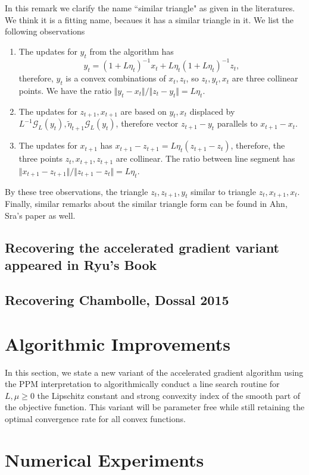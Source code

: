 \documentclass[12pt]{article}
\begin{document}
        \begin{remark}
            In this remark we clarify the name ``similar triangle" as given in the literatures. 
            We think it is a fitting name, becaues it has a similar triangle in it. 
            We list the following observations
            \begin{enumerate}
                \item 
                The updates for $y_{t}$ from the algorithm has 
                $$
                    y_t = (1 + L\eta_t)^{-1} x_t + L\eta_t(1 + L\eta_t)^{-1} z_t, 
                $$
                therefore, $y_t$ is a convex combinations of $x_t, z_t$, so $z_t, y_t, x_t$ are three collinear points. 
                We have the ratio $\Vert y_t - x_t\Vert/\Vert z_t - y_t\Vert = L\eta_t$. 
                \item 
                The updates for $z_{t + 1}, x_{t + 1}$ are based on $y_t, x_t$ displaced by $L^{-1} \mathcal G_L(y_t), \tilde\eta_{t +1} \mathcal G_L(y_t)$, therefore vector $z_{t + 1} - y_t$ parallels to $x_{t + 1} - x_t$. 
                \item The updates for $x_{t + 1}$ has $x_{t + 1} - z_{t + 1} = L\eta_t \left(z_{t + 1} - z_t\right)$, therefore, the three points $z_t, x_{t + 1}, z_{t + 1}$ are collinear. 
                The ratio between line segment has $\Vert x_{t + 1} - z_{t + 1}\Vert/\Vert z_{t + 1} - z_t\Vert = L\eta_t$. 
            \end{enumerate}
            By these tree observations, the triangle $z_{t}, z_{t + 1}, y_t$ similar to triangle $z_t, x_{t + 1}, x_t$. 
            Finally, similar remarks about the similar triangle form can be found in Ahn, Sra's paper \cite{ahn_understanding_2022} as well. 
            
        \end{remark} 
        
    \subsection{Recovering the accelerated gradient variant appeared in Ryu's Book}
    \subsection{Recovering Chambolle, Dossal 2015}

\section{Algorithmic Improvements}\label{sec:algorithm_improved}
    In this section, we state a new variant of the accelerated gradient algorithm using the PPM interpretation to algorithmically conduct a line search routine for $L, \mu \ge 0$ the Lipschitz constant and strong convexity index of the smooth part of the objective function. 
    This variant will be parameter free while still retaining the optimal convergence rate for all convex functions. 

\section{Numerical Experiments}\label{sec:numerical_experiments}

\appendix

\printbibliography
\end{document}
